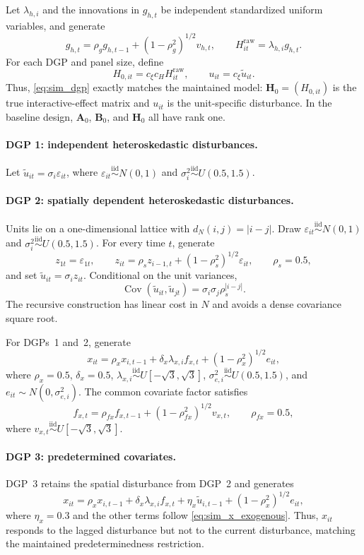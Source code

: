 \documentclass[11pt]{article}
\numberwithin{equation}{section}
\theoremstyle{remark}
\newcommand{\bA}{\bm A}
\newcommand{\bB}{\bm B}
\newcommand{\bH}{\bm H}
\begin{document}
Let $\lambda_{h,i}$ and the innovations in $g_{h,t}$ be independent standardized uniform variables, and generate
$$
g_{h,t}=\rho_g g_{h,t-1}+(1-\rho_g^2)^{1/2}v_{h,t},
\qquad
H_{it}^{\mathrm{raw}}=\lambda_{h,i}g_{h,t}.
$$
For each DGP and panel size, define
$$
H_{0,it}=c_\xi c_H H_{it}^{\mathrm{raw}},
\qquad
u_{it}=c_\xi\widetilde u_{it}.
$$
Thus, \eqref{eq:sim_dgp} exactly matches the maintained model: $\bH_0=(H_{0,it})$ is the true interactive-effect matrix and $u_{it}$ is the unit-specific disturbance. In the baseline design, $\bA_0$, $\bB_0$, and $\bH_0$ all have rank one.

\paragraph{DGP 1: independent heteroskedastic disturbances.}
Let $\widetilde u_{it}=\sigma_i\varepsilon_{it}$, where $\varepsilon_{it}\stackrel{\mathrm{iid}}{\sim}N(0,1)$ and $\sigma_i^2\stackrel{\mathrm{iid}}{\sim}U(0.5,1.5)$.

\paragraph{DGP 2: spatially dependent heteroskedastic disturbances.}
Units lie on a one-dimensional lattice with $d_N(i,j)=|i-j|$. Draw $\varepsilon_{it}\stackrel{\mathrm{iid}}{\sim}N(0,1)$ and $\sigma_i^2\stackrel{\mathrm{iid}}{\sim}U(0.5,1.5)$. For every time $t$, generate
$$
z_{1t}=\varepsilon_{1t},
\qquad
z_{it}=\rho_s z_{i-1,t}+(1-\rho_s^2)^{1/2}\varepsilon_{it},
\qquad
\rho_s=0.5,
$$
and set $\widetilde u_{it}=\sigma_i z_{it}$. Conditional on the unit variances,
$$
\operatorname{Cov}(\widetilde u_{it},\widetilde u_{jt})
=
\sigma_i\sigma_j\rho_s^{|i-j|}.
$$
The recursive construction has linear cost in $N$ and avoids a dense covariance square root.

For DGPs~1 and~2, generate
\begin{equation}
\label{eq:sim_x_exogenous}
x_{it}
=
\rho_xx_{i,t-1}
+
\delta_x\lambda_{x,i}f_{x,t}
+
(1-\rho_x^2)^{1/2}e_{it},
\end{equation}
where $\rho_x=0.5$, $\delta_x=0.5$, $\lambda_{x,i}\stackrel{\mathrm{iid}}{\sim}U[-\sqrt 3,\sqrt 3]$, $\sigma_{e,i}^2\stackrel{\mathrm{iid}}{\sim}U(0.5,1.5)$, and $e_{it}\sim N(0,\sigma_{e,i}^2)$. The common covariate factor satisfies
$$
f_{x,t}=\rho_{fx}f_{x,t-1}+(1-\rho_{fx}^2)^{1/2}v_{x,t},
\qquad
\rho_{fx}=0.5,
$$
where $v_{x,t}\stackrel{\mathrm{iid}}{\sim}U[-\sqrt 3,\sqrt 3]$.

\paragraph{DGP 3: predetermined covariates.}
DGP~3 retains the spatial disturbance from DGP~2 and generates
\begin{equation}
\label{eq:sim_x_predetermined}
x_{it}
=
\rho_xx_{i,t-1}
+
\delta_x\lambda_{x,i}f_{x,t}
+
\eta_x\widetilde u_{i,t-1}
+
(1-\rho_x^2)^{1/2}e_{it},
\end{equation}
where $\eta_x=0.3$ and the other terms follow \eqref{eq:sim_x_exogenous}. Thus, $x_{it}$ responds to the lagged disturbance but not to the current disturbance, matching the maintained predeterminedness restriction.
\end{document}
